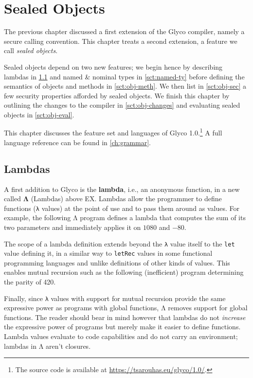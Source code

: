 \documentclass[main.tex]{subfiles}
\begin{document}
\onlyinsubfile{\mainmatter{}}

\chapter{Sealed Objects}
The previous chapter discussed a first extension of the Glyco compiler, namely a secure calling convention. This chapter treats a second extension, a feature we call \emph{sealed objects}.

Sealed objects depend on two new features; we begin hence by describing lambdas in \cref{sct:lambda} and named \& nominal types in \cref{sct:named-ty} before defining the semantics of objects and methods in \cref{sct:obj-meth}. We then list in \cref{sct:obj-sec} a few security properties afforded by sealed objects. We finish this chapter by outlining the changes to the compiler in \cref{sct:obj-changes} and evaluating sealed objects in \cref{sct:obj-eval}.

This chapter discusses the feature set and languages of Glyco 1.0.\footnote{The source code is available at \url{https://tsarouhas.eu/glyco/1.0/}.} A full language reference can be found in \cref{ch:grammar}.

\section{Lambdas} \label{sct:lambda}
A first addition to Glyco is the \textbf{lambda}, i.e., an anonymous function, in a new  called \textbf{Λ} (Lambdas) above EX. Lambdas allow the programmer to define functions (\texttt{λ} values) at the point of use and to pass them around as values. For example, the following Λ program defines a lambda that computes the sum of its two parameters and immediately applies it on $1080$ and $-80$.

The scope of a lambda definition extends beyond the \texttt{λ} value itself to the \texttt{let} value defining it, in a similar way to \texttt{letRec} values in some functional programming languages and unlike definitions of other kinds of values. This enables mutual recursion such as the following (inefficient) program determining the parity of 420.

Finally, since \texttt{λ} values with support for mutual recursion provide the same expressive power as programs with global functions, Λ removes support for global functions. The reader should bear in mind however that lambdas do not \emph{increase} the expressive power of programs but merely make it easier to define functions. Lambda values evaluate to code capabilities and do not carry an environment; lambdas in Λ aren't closures.
\end{document}
